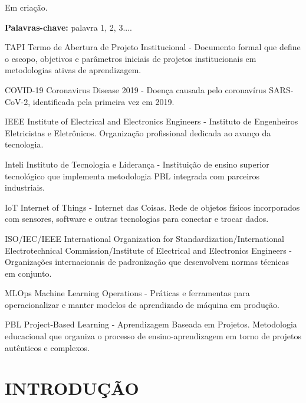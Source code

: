 \documentclass[12pt, a4paper, oneside]{abntex2}
\begin{document}
\imprimircapa
\imprimirfolhaderosto

\begin{resumo}
  Em criação.
  \par
  \textbf{Palavras-chave:} palavra 1, 2, 3....
\end{resumo}

\begin{siglas}
\item[TAPI] Termo de Abertura de Projeto Institucional - Documento formal que define o escopo, objetivos e parâmetros iniciais de projetos institucionais em metodologias ativas de aprendizagem.
\item[COVID-19] Coronavirus Disease 2019 - Doença causada pelo coronavírus SARS-CoV-2, identificada pela primeira vez em 2019.
\item[IEEE] Institute of Electrical and Electronics Engineers - Instituto de Engenheiros Eletricistas e Eletrônicos. Organização profissional dedicada ao avanço da tecnologia.
\item[Inteli] Instituto de Tecnologia e Liderança - Instituição de ensino superior tecnológico que implementa metodologia PBL integrada com parceiros industriais.
\item[IoT] Internet of Things - Internet das Coisas. Rede de objetos físicos incorporados com sensores, software e outras tecnologias para conectar e trocar dados.
\item[ISO/IEC/IEEE] International Organization for Standardization/International Electrotechnical Commission/Institute of Electrical and Electronics Engineers - Organizações internacionais de padronização que desenvolvem normas técnicas em conjunto.
\item[MLOps] Machine Learning Operations - Práticas e ferramentas para operacionalizar e manter modelos de aprendizado de máquina em produção.
\item[PBL] Project-Based Learning - Aprendizagem Baseada em Projetos. Metodologia educacional que organiza o processo de ensino-aprendizagem em torno de projetos autênticos e complexos.
\end{siglas}

\tableofcontents

\textual

\section{INTRODUÇÃO}
\end{document}
